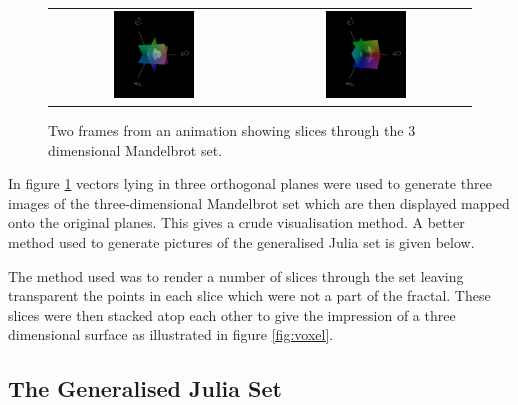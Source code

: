 \begin{figure}
\centering
\begin{tabular}{c@{$\quad$}c}
\includegraphics[width=0.4\textwidth]{3dmandel1}
 & \includegraphics[width=0.4\textwidth]{3dmandel2} 
\end{tabular}
\caption{\label{fig:3dmandel}
  Two frames from an animation showing slices through
          the 3 dimensional Mandelbrot set.}
\end{figure}


In figure \ref{fig:3dmandel} vectors lying in three orthogonal
planes were used to generate three images of the three-dimensional
Mandelbrot set which are then displayed mapped onto the original planes. This
gives a crude visualisation method. A better method used to generate pictures
of the generalised Julia set is given below.

The method used was to render a number of slices through the set leaving transparent the points in
each slice which were not a part of the fractal. These slices were then stacked
atop each other to give the impression of a three dimensional surface as illustrated
in figure \ref{fig:voxel}.

\subsection{The Generalised Julia Set}

